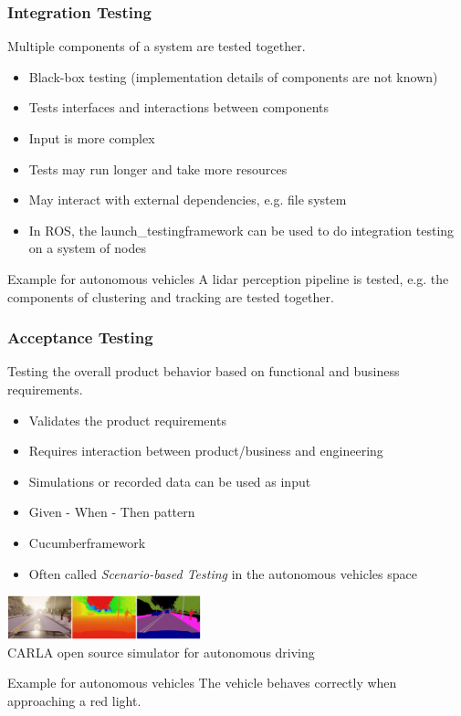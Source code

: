 \begin{frame}
\frametitle{Integration Testing}
Multiple components of a system are tested together.
\begin{itemize}
    \item Black-box testing (implementation details of components are not known)
    \item Tests interfaces and interactions between components
    \item Input is more complex
    \item Tests may run longer and take more resources
    \item May interact with external dependencies, e.g. file system
    \item In ROS, the launch\_testing\footnotemark[1] framework can be used to
        do integration testing on a system of nodes
\end{itemize}
\begin{exampleblock}{Example for autonomous vehicles}
A lidar perception pipeline is tested, e.g. the components of clustering and
tracking are tested together.
\end{exampleblock}
\end{frame}

\begin{frame}
\frametitle{Acceptance Testing}
Testing the overall product behavior based on functional and business
requirements.
\begin{itemize}
    \item Validates the product requirements
    \item Requires interaction between product/business and engineering
    \item Simulations or recorded data can be used as input
    \item Given - When - Then pattern
    \item Cucumber\footnotemark[1] framework
    \item Often called \emph{Scenario-based Testing} in the autonomous vehicles
        space
\end{itemize}
\begin{center}
\includegraphics[width=0.42\textwidth]{images/carla_simulation.png}\\
\footnotesize{CARLA open source simulator for autonomous driving \cite{Dosovitskiy17}}
\end{center}
\begin{exampleblock}{Example for autonomous vehicles}
The vehicle behaves correctly when approaching a red light.
\end{exampleblock}
\end{frame}

